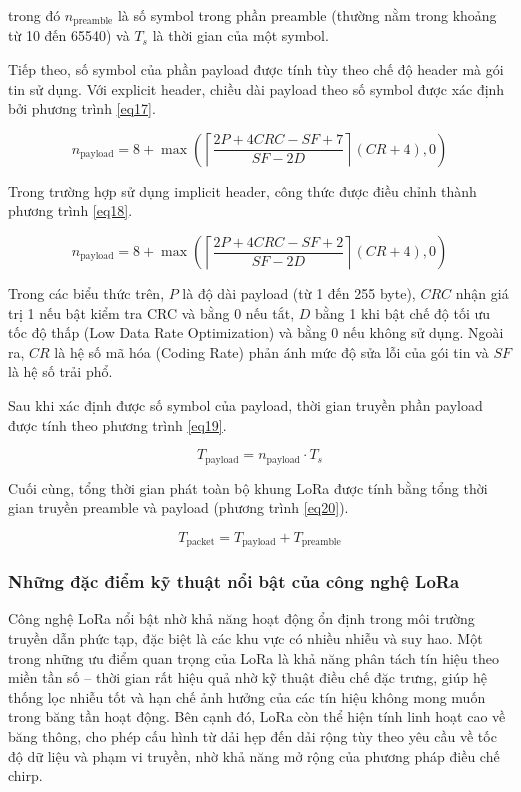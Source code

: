 \documentclass{article}
\begin{document}
	trong đó $n_{\text{preamble}}$ là số symbol trong phần preamble (thường nằm trong khoảng từ 10 đến 65540) và $T_s$ là thời gian của một symbol.
	
	Tiếp theo, số symbol của phần payload được tính tùy theo chế độ header mà gói tin sử dụng. Với explicit header, chiều dài payload theo số symbol được xác định bởi phương trình \ref{eq17}.
	
	\begin{equation}\label{eq17}
		n_{\text{payload}} = 8 + \max \left(\left\lceil\frac{2P + 4CRC - SF + 7}{SF - 2D}\right\rceil (CR + 4), 0\right)
	\end{equation}
	
	Trong trường hợp sử dụng implicit header, công thức được điều chỉnh thành phương trình \ref{eq18}.
	
	\begin{equation}\label{eq18}
		n_{\text{payload}} = 8 + \max \left(\left\lceil\frac{2P + 4CRC - SF + 2}{SF - 2D}\right\rceil (CR + 4), 0\right)
	\end{equation}
	
	Trong các biểu thức trên, $P$ là độ dài payload (từ 1 đến 255 byte), $CRC$ nhận giá trị 1 nếu bật kiểm tra CRC và bằng 0 nếu tắt, $D$ bằng 1 khi bật chế độ tối ưu tốc độ thấp (Low Data Rate Optimization) và bằng 0 nếu không sử dụng. Ngoài ra, $CR$ là hệ số mã hóa (Coding Rate) phản ánh mức độ sửa lỗi của gói tin và $SF$ là hệ số trải phổ.
	
	Sau khi xác định được số symbol của payload, thời gian truyền phần payload được tính theo phương trình \ref{eq19}.
	
	\begin{equation}\label{eq19}
		T_{\text{payload}} = n_{\text{payload}} \cdot T_s
	\end{equation}
	
	Cuối cùng, tổng thời gian phát toàn bộ khung LoRa được tính bằng tổng thời gian truyền preamble và payload (phương trình \ref{eq20}).
	
	\begin{equation}\label{eq20}
		T_{\text{packet}} = T_{\text{payload}} + T_{\text{preamble}}
	\end{equation}
	
	\subsubsection{Những đặc điểm kỹ thuật nổi bật của công nghệ LoRa}
	
	Công nghệ LoRa nổi bật nhờ khả năng hoạt động ổn định trong môi trường truyền dẫn phức tạp, đặc biệt là các khu vực có nhiều nhiễu và suy hao. Một trong những ưu điểm quan trọng của LoRa là khả năng phân tách tín hiệu theo miền tần số – thời gian rất hiệu quả nhờ kỹ thuật điều chế đặc trưng, giúp hệ thống lọc nhiễu tốt và hạn chế ảnh hưởng của các tín hiệu không mong muốn trong băng tần hoạt động. Bên cạnh đó, LoRa còn thể hiện tính linh hoạt cao về băng thông, cho phép cấu hình từ dải hẹp đến dải rộng tùy theo yêu cầu về tốc độ dữ liệu và phạm vi truyền, nhờ khả năng mở rộng của phương pháp điều chế chirp.
	
\end{document}
